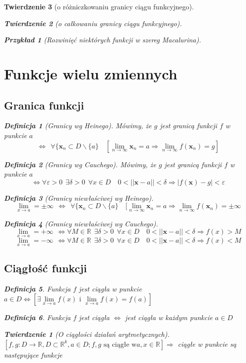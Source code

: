\documentclass[12pt,a4paper]{article}
\newtheorem{tw}{Twierdzenie}
\newtheorem{przyklad}{Przykład}
\theoremstyle{definition}
\newtheorem{df}{Definicja}
\begin{document}
\begin{tw}[o różniczkowaniu granicy ciągu funkcyjnego]
\begin{tw}[o całkowaniu granicy ciągu funkcyjnego]
\begin{przyklad}[Rozwinięć niektórych funkcji w szereg Macalurina]
\section{Funkcje wielu zmiennych}
\subsection{Granica funkcji}
\begin{df}[Granicy wg Heinego]
Mówimy, że $g$ jest granicą funkcji $f$ w punkcie $a$
$$\Leftrightarrow ~~\forall \{\mathbf{x}_n \subset D \smallsetminus \{a\} \quad [\lim\limits_{n\to\infty}\mathbf{x}_n = a \Rightarrow \lim\limits_{n\to\infty}f(\mathbf{x}_n)=g]$$
\end{df}
\begin{df}[Granicy wg Cauchego]
Mówimy, że $g$ jest granicą funkcji $f$ w punkcie $a$
$$\Leftrightarrow \forall\varepsilon >0 ~~\exists \delta >0 ~~\forall x\in D \quad 0<||\mathbf{x} - a|| <\delta \Rightarrow |f(\mathbf{x})-g| < \varepsilon$$
\end{df}
\begin{df}[Granicy niewłaściwej wg Heinego]
$$\lim\limits_{x\to a} = \pm \infty~~\Leftrightarrow ~~\forall \{\mathbf{x}_n \subset D \smallsetminus \{a\} \quad [\lim\limits_{n\to\infty}\mathbf{x}_n = a \Rightarrow \lim\limits_{n\to\infty}f(\mathbf{x}_n)=\pm\infty$$
\end{df}
\begin{df}[Granicy niewłaściwej wg Cauchego]
$$\lim\limits_{x\to a} = +\infty~~\Leftrightarrow \forall M\in\mathbb{R}~~\exists \delta >0 ~~\forall x\in D \quad 0<||\mathbf{x} - a|| <\delta \Rightarrow f(x) > M$$
$$\lim\limits_{x\to a} = -\infty~~\Leftrightarrow \forall M\in\mathbb{R}~~\exists \delta >0 ~~\forall x\in D \quad 0<||\mathbf{x} - a|| <\delta \Rightarrow f(x) < M$$
\end{df}

\subsection{Ciągłość funkcji}
\begin{df}
Funkcja $f$ jest ciągła w punkcie $a\in D \Leftrightarrow [\exists \lim\limits_{x\to a}f(x) \text{ i } \lim\limits_{x\to a}f(x) = f(a)]$ 
\end{df}
\begin{df}
Funkcja $f$ jest ciągła $\Leftrightarrow$ jest ciągła w każdym punkcie $a\in D$
\end{df}

\begin{tw}[O ciągłości działań arytmetycznych]~\\
$[f,g: D\to \mathbb{R}, D\subset\mathbb{R}^k, a\in D; f,g \text{ są ciągłe w} a, x\in\mathbb{R}] \Rightarrow$ ciągłe w punkcie są następujące funkcje


\end{tw}
\end{przyklad}
\end{tw}
\end{tw}
\end{document}
